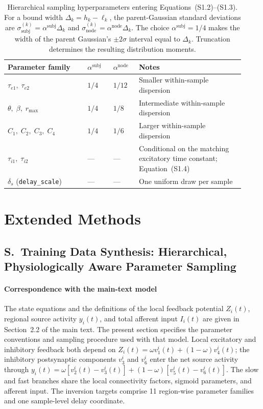 \documentclass[11pt]{article}
\newcounter{suppsec}
\renewcommand{\thesuppsec}{S\arabic{suppsec}}
\newcommand{\suppsubsection}[1]{%
  \refstepcounter{suppsec}%
  \subsection*{\thesuppsec.\ #1}%
}
\begin{document}
\begin{table}[t]
\centering
\caption{Hierarchical sampling hyperparameters entering Equations~(S1.2)--(S1.3). For a bound width $\Delta_k=h_k-\ell_k$, the parent-Gaussian standard deviations are $\sigma_{\mathrm{subj}}^{(k)}=\alpha^{\mathrm{subj}}\Delta_k$ and $\sigma_{\mathrm{node}}^{(k)}=\alpha^{\mathrm{node}}\Delta_k$. The choice $\alpha^{\mathrm{subj}}=1/4$ makes the width of the parent Gaussian's $\pm2\sigma$ interval equal to $\Delta_k$. Truncation determines the resulting distribution moments.}
\label{tab:supp_sampler_hp}
\small
\begin{tabular}{@{}p{0.31\linewidth}p{0.10\linewidth}p{0.10\linewidth}p{0.41\linewidth}@{}}
\toprule
\textbf{Parameter family} & $\alpha^{\mathrm{subj}}$ & $\alpha^{\mathrm{node}}$ & \textbf{Notes} \\
\midrule
$\tau_{e1},\;\tau_{e2}$ & $1/4$ & $1/12$ & Smaller within-sample dispersion \\
$\theta,\;\beta,\;r_{\max}$ & $1/4$ & $1/8$ & Intermediate within-sample dispersion \\
$C_1,\;C_2,\;C_3,\;C_4$ & $1/4$ & $1/6$ & Larger within-sample dispersion \\
$\tau_{i1},\;\tau_{i2}$ & --- & --- & Conditional on the matching excitatory time constant; Equation~(S1.4) \\
$\delta_s$ (\texttt{delay\_scale}) & --- & --- & One uniform draw per sample \\
\bottomrule
\end{tabular}
\end{table}

\section*{Extended Methods}

\suppsubsection{Training Data Synthesis: Hierarchical, Physiologically Aware Parameter Sampling}
\label{sec:supp_sampling}

\paragraph{Correspondence with the main-text model}
The state equations and the definitions of the local feedback potential $Z_i(t)$, regional source activity $y_i(t)$, and total afferent input $I_i(t)$ are given in Section~2.2 of the main text. The present section specifies the parameter conventions and sampling procedure used with that model. Local excitatory and inhibitory feedback both depend on $Z_i(t)=\omega v_1^i(t)+(1-\omega)v_4^i(t)$; the inhibitory postsynaptic components $v_3^i$ and $v_6^i$ enter the net source activity through $y_i(t)=\omega[v_2^i(t)-v_3^i(t)]+(1-\omega)[v_5^i(t)-v_6^i(t)]$. The slow and fast branches share the local connectivity factors, sigmoid parameters, and afferent input. The inversion targets comprise 11 region-wise parameter families and one sample-level delay coordinate.
\end{document}
